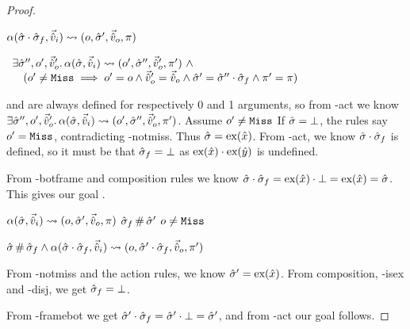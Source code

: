 \begin{proof}

\pfassume \begin{hypvlist}
 $\alpha(\hat{\sigma}\cdot\hat{\sigma}_f,\vec{\hat{v}}_i)\rightsquigarrow(o,\hat{\sigma}',\vec{\hat{v}}_o,\pi)$
\end{hypvlist}
\pfprove \begin{goalvlist}
 $\begin{array}{l}
\exists \hat{\sigma}'', o', \vec{\hat{v}}_o'\ldotp \alpha(\hat{\sigma},\vec{\hat{v}}_i)\rightsquigarrow(o', \hat{\sigma}'', \vec{\hat{v}}_o', \pi') ~\land \\
\quad(o' \neq \texttt{Miss} \implies o' = o \land  \vec{\hat{v}}_o' = \vec{\hat{v}}_o \land \hat{\sigma}' = \hat{\sigma}'' \cdot \hat{\sigma}_f \land \pi' = \pi)
\end{array}$
\end{goalvlist}
\begin{hypvlist}
	 \load{} and \store{} are always defined for respectively 0 and 1 arguments, so from \hyp{act} we know $\exists \hat{\sigma}'', o', \vec{\hat{v}}_o'\ldotp \alpha(\hat{\sigma},\vec{\hat{v}}_i)\rightsquigarrow(o', \hat{\sigma}'', \vec{\hat{v}}_o', \pi')$.
	 Assume $o'\neq\texttt{Miss}$
	 If $\hat{\sigma}=\bot$, the rules say $o'=\texttt{Miss}$, contradicting \hyp{notmiss}. Thus $\hat{\sigma}=\text{ex}(\hat{x})$.
	 From \hyp{act}, we know $\hat{\sigma}\cdot\hat{\sigma}_f$ is defined, so it must be that $\hat{\sigma}_f=\bot$ as $\text{ex}(\hat{x})\cdot\text{ex}(\hat{y})$ is undefined.
\end{hypvlist}
From \hyp{botframe} and composition rules we know $\hat{\sigma}\cdot\hat{\sigma}_f=\text{ex}(\hat{x})\cdot\bot=\text{ex}(\hat{x})=\hat{\sigma}$. This gives our goal .


\pfassume \begin{hypvlist}
 $\alpha(\hat{\sigma},\vec{\hat{v}}_i)\rightsquigarrow(o,\hat{\sigma}',\vec{\hat{v}}_o,\pi)$
 $\hat{\sigma}_f\operatorname{\#}\hat{\sigma}'$
 $o\neq\texttt{Miss}$
\end{hypvlist}
\pfprove \begin{goalvlist}
 $\hat{\sigma} \operatorname{\#} \hat{\sigma}_f \land \alpha(\hat{\sigma}\cdot\hat{\sigma}_f, \vec{\hat{v}}_i)\rightsquigarrow(o, \hat{\sigma}'\cdot\hat{\sigma}_f, \vec{\hat{v}}_o, \pi')$	
\end{goalvlist}
\begin{hypvlist}
 From \hyp{notmiss} and the action rules, we know $\hat{\sigma}'=\text{ex}(\hat{x})$.
 From composition, \hyp{isex} and \hyp{disj}, we get $\hat{\sigma}_f=\bot$.
\end{hypvlist}
From \hyp{framebot} we get $\hat{\sigma}'\cdot\hat{\sigma}_f=\hat{\sigma}'\cdot\bot=\hat{\sigma}'$, and from \hyp{act} our goal  follows.


\end{proof}

